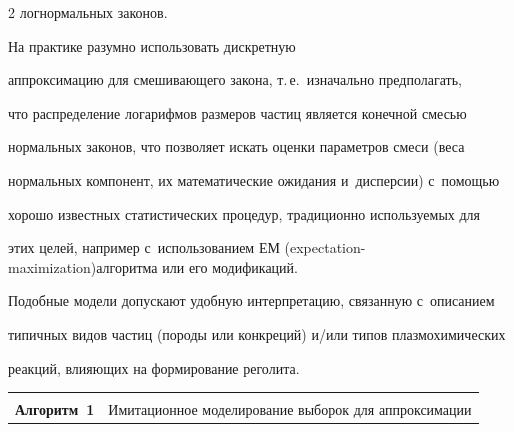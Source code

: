 \begin{multicols}{2}
логнормальных законов. 





На практике разумно использовать дискрет\-ную 


аппроксимацию для смешивающего закона, т.\,е.\ изначально предполагать, 


что распределение логарифмов размеров частиц является конечной смесью 


нормальных законов, что позволяет искать оценки параметров смеси (веса 


нормальных компонент, их математические ожидания и~дисперсии) с~помощью 


хорошо известных статистических процедур, традиционно используемых для 


этих целей, например с~использованием ЕМ (expectation-maximization)\linebreak алгоритма или его модификаций. 


Подобные модели допускают удобную интерпретацию, связанную с~описанием 


типичных видов частиц (породы или конкреций) и/или типов плазмохимических\linebreak 


реакций, влияющих на формирование ре\-го\-лита.


{ %





}





\renewcommand{\tablename}{\protect\bf Алгоритм}


\begin{table}[b]\small %


\vspace*{9pt}


\begin{center}










\begin{tabular}{l}


\hline


\\[-8pt]


\multicolumn{1}{c}{{\tablename\ 1}\ \  Имитационное моделирование выборок для аппроксимации 


}
\end{tabular}
\end{center}
\end{table}
\end{multicols}
